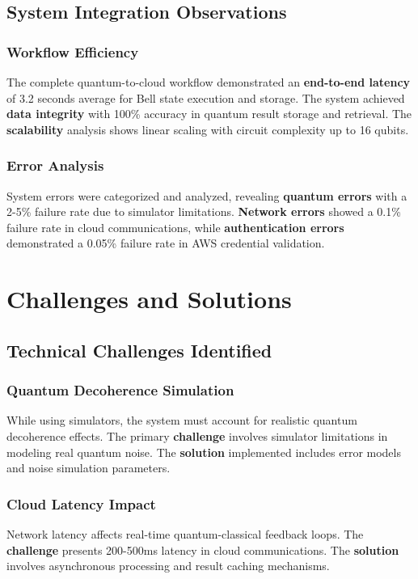 \documentclass[onecolumn]{IEEEtran}
\begin{document}
\subsection{System Integration Observations}

\subsubsection{Workflow Efficiency}

The complete quantum-to-cloud workflow demonstrated an \textbf{end-to-end latency} of 3.2 seconds average for Bell state execution and storage. The system achieved \textbf{data integrity} with 100\% accuracy in quantum result storage and retrieval. The \textbf{scalability} analysis shows linear scaling with circuit complexity up to 16 qubits.

\subsubsection{Error Analysis}

System errors were categorized and analyzed, revealing \textbf{quantum errors} with a 2-5\% failure rate due to simulator limitations. \textbf{Network errors} showed a 0.1\% failure rate in cloud communications, while \textbf{authentication errors} demonstrated a 0.05\% failure rate in AWS credential validation.

\section{Challenges and Solutions}

\subsection{Technical Challenges Identified}

\subsubsection{Quantum Decoherence Simulation}
While using simulators, the system must account for realistic quantum decoherence effects. The primary \textbf{challenge} involves simulator limitations in modeling real quantum noise. The \textbf{solution} implemented includes error models and noise simulation parameters.

\subsubsection{Cloud Latency Impact}
Network latency affects real-time quantum-classical feedback loops. The \textbf{challenge} presents 200-500ms latency in cloud communications. The \textbf{solution} involves asynchronous processing and result caching mechanisms.
\end{document}
